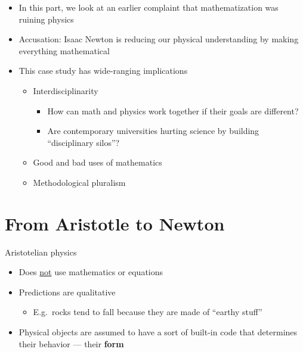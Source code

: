 \documentclass[fleqn]{beamer}
\newcommand{\kw}[1]{\textbf{#1}}
\begin{document}
\begin{frame}

  \begin{itemize}
  \item In this part, we look at an earlier complaint that
    mathematization was ruining physics
  \item Accusation: Isaac Newton is reducing our physical
    understanding by making everything mathematical
  \end{itemize}

\end{frame}

\begin{frame}

  \begin{itemize}
  \item This case study has wide-ranging implications
  \begin{itemize}
    \item Interdisciplinarity
    \begin{itemize}
      \item How can math and physics work together if their goals are
        different?
      \item Are contemporary universities hurting science by building
        ``disciplinary silos''?
    \end{itemize}
    \item Good and bad uses of mathematics
    \item Methodological pluralism
  \end{itemize}
  \end{itemize}

\end{frame}

\section{From Aristotle to Newton}

\begin{frame}{Aristotelian physics}

  \begin{itemize}
  \item Does \ul{not} use mathematics or equations
  \item Predictions are qualitative
    \begin{itemize}
    \item E.g.\ rocks tend to fall because they are made of ``earthy
      stuff''
    \end{itemize}
  \item Physical objects are assumed to have a sort of built-in code
    that determines their behavior --- their \kw{form}
  \end{itemize}

\end{frame}
\end{document}
